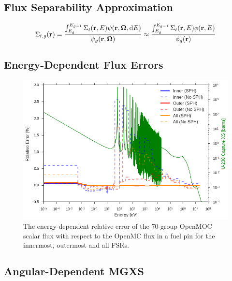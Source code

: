 \documentclass[12pt,twoside]{mitthesis-exec}
\begin{document}
\subsection*{Flux Separability Approximation}

\begin{dmath}
\label{eqn:sigt-flux-separable}
\Sigma_{t,g}(\mathbf{r}) = \frac{\int\displaylimits_{E_{g}}^{E_{g-1}} \Sigma_{t}(\mathbf{r},E)\psi(\mathbf{r},\mathbf{\Omega},\mathrm{d}E)}{\psi_{g}(\mathbf{r},\mathbf{\Omega})} \approx \frac{\int\displaylimits_{E_{g}}^{E_{g-1}} \Sigma_{t}(\mathbf{r},E)\phi(\mathbf{r},E)}{\phi_{g}(\mathbf{r})}
\end{dmath}

\clearpage

\subsection*{Energy-Dependent Flux Errors}

\begin{figure}[h!]
\centering
\includegraphics[width=\linewidth]{figures/sph/pin-cell/rel-err-inner-outer}
\caption[Flux relative error by energy group with SPH]{The energy-dependent relative error of the 70-group OpenMOC scalar flux with respect to the OpenMC flux in a fuel pin for the innermost, outermost and all FSRs.}
\label{fig:rel-err-energy}
\end{figure}

\clearpage

\subsection*{Angular-Dependent MGXS}
\end{document}

